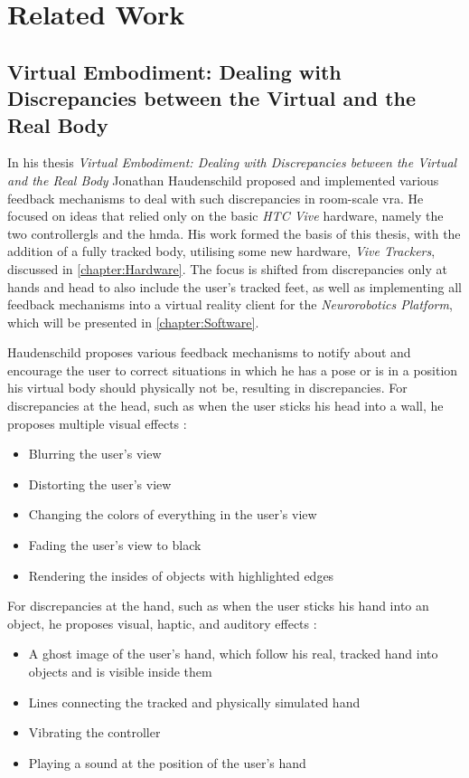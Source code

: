 
\chapter{Related Work}\label{chapter:RelatedWork}

\section{Virtual Embodiment: Dealing with Discrepancies between the Virtual and the Real Body}

In his thesis \textit{Virtual Embodiment:  Dealing with Discrepancies between the Virtual and the Real Body} \autocite{JohnnyVEThesis} Jonathan Haudenschild proposed and implemented various feedback mechanisms to deal with such discrepancies in room-scale \gls{vra}. He focused on ideas that relied only on the basic \textit{HTC Vive} hardware, namely the two \glspl{controllergl} and the \gls{hmda}.
\newline
His work formed the basis of this thesis, with the addition of a fully tracked body, utilising some new hardware, \textit{Vive Trackers}, discussed in \autoref{chapter:Hardware}. The focus is shifted from discrepancies only at hands and head to also include the user's tracked feet, as well as implementing all feedback mechanisms into a virtual reality client for the \textit{Neurorobotics Platform}, which will be presented in \autoref{chapter:Software}.
\newline

Haudenschild proposes various feedback mechanisms to notify about and encourage the user to correct situations in which he has a pose or is in a position his virtual body should physically not be, resulting in discrepancies.
\newline
For discrepancies at the head, such as when the user sticks his head into a wall, he proposes multiple visual effects \autocite[p. ~20]{JohnnyVEThesis}:
\begin{itemize}
    \item Blurring the user's view
    \item Distorting the user's view
    \item Changing the colors of everything in the user's view
    \item Fading the user's view to black
    \item Rendering the insides of objects with highlighted edges
\end{itemize}
For discrepancies at the hand, such as when the user sticks his hand into an object, he proposes visual, haptic, and auditory effects \autocite[p. ~24-25]{JohnnyVEThesis}:
\begin{itemize}
    \item A ghost image of the user's hand, which follow his real, tracked hand into objects and is visible inside them
    \item Lines connecting the tracked and physically simulated hand
    \item Vibrating the controller
    \item Playing a sound at the position of the user's hand
\end{itemize}

